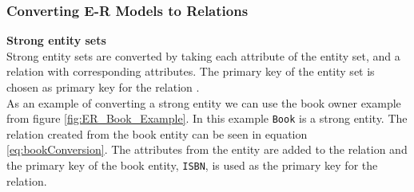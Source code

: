 \subsubsection*{Converting E-R Models to Relations}
\textbf{Strong entity sets}\\
Strong entity sets are converted by taking each attribute of the entity set, and a relation with corresponding attributes. 
The primary key of the entity set is chosen as primary key for the relation \cite{DBSBook}.\\
As an example of converting a strong entity we can use the book owner example from figure \ref{fig:ER_Book_Example}. In this example \texttt{Book} is a strong entity. The relation created from the book entity can be seen in equation \ref*{eq:bookConversion}. The attributes from the entity are added to the relation and the primary key of the book entity, \texttt{ISBN}, is used as the primary key for the relation.


